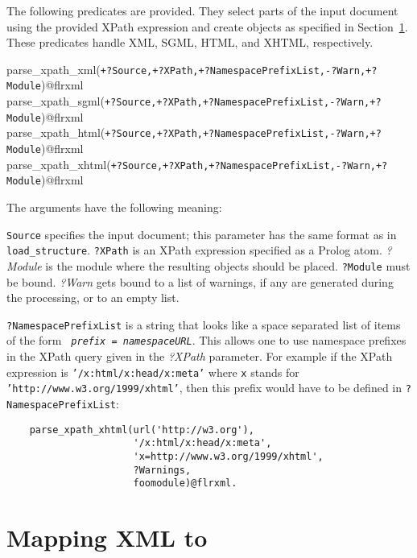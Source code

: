 The following predicates are provided. They select parts of the input
document using the provided XPath expression and create \FLORA objects as
specified in Section~\ref{xml-to-flora}. These predicates handle XML, SGML,
HTML, and XHTML, respectively.

\begin{description}
\item[parse\_xpath\_xml({\tt +?Source,+?XPath,+?NamespacePrefixList,-?Warn,+?Module})@flrxml]
\item[parse\_xpath\_sgml({\tt +?Source,+?XPath,+?NamespacePrefixList,-?Warn,+?Module})@flrxml]
\item[parse\_xpath\_html({\tt +?Source,+?XPath,+?NamespacePrefixList,-?Warn,+?Module})@flrxml]
\item[parse\_xpath\_xhtml({\tt +?Source,+?XPath,+?NamespacePrefixList,-?Warn,+?Module})@flrxml]
\end{description}
The arguments have the following meaning:

{\tt Source} specifies the input document; this parameter has the same
format as in {\tt load\_structure}. {\tt ?XPath} is an XPath expression
specified as a Prolog atom. \emph{?Module} is the module where the resulting
\FLORA objects should be placed. {\tt ?Module} must be bound. \emph{?Warn}
gets bound to a list of warnings, if any are generated during the
processing, or to an empty list.

{\tt ?NamespacePrefixList} is a string that looks like a
space separated list of items of the form {\tt
  \emph{prefix} = \emph{namespaceURL}}. This allows one to use namespace
prefixes in the
XPath query given in the \emph{?XPath} parameter.
For example if the XPath expression is {\tt '/x:html/x:head/x:meta'}
where {\tt x} 
stands for {\tt 'http://www.w3.org/1999/xhtml'}, then this
prefix would have to be
defined in {\tt ?NamespacePrefixList}:

\begin{verbatim}	
    parse_xpath_xhtml(url('http://w3.org'),
                      '/x:html/x:head/x:meta',
                      'x=http://www.w3.org/1999/xhtml',
                      ?Warnings,
                      foomodule)@flrxml.
\end{verbatim}



\section{Mapping XML to \FLORA}\label{xml-to-flora}

